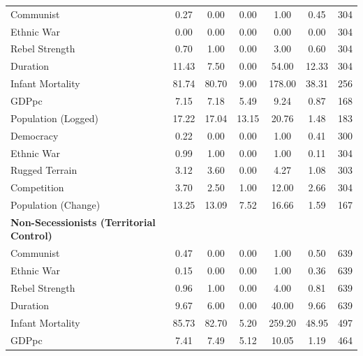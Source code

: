 \documentclass[12pt, letterpaper]{article}
\begin{document}
\begin{table}[htbp]
\begin{tabular}{l*{1}{cccccc}}
Communist           &        0.27&        0.00&        0.00&        1.00&        0.45&         304\\
Ethnic War          &        0.00&        0.00&        0.00&        0.00&        0.00&         304\\
Rebel Strength      &        0.70&        1.00&        0.00&        3.00&        0.60&         304\\
Duration            &       11.43&        7.50&        0.00&       54.00&       12.33&         304\\
Infant Mortality    &       81.74&       80.70&        9.00&      178.00&       38.31&         256\\
GDPpc               &        7.15&        7.18&        5.49&        9.24&        0.87&         168\\
Population (Logged) &       17.22&       17.04&       13.15&       20.76&        1.48&         183\\
Democracy           &        0.22&        0.00&        0.00&        1.00&        0.41&         300\\
Ethnic War          &        0.99&        1.00&        0.00&        1.00&        0.11&         304\\
Rugged Terrain      &        3.12&        3.60&        0.00&        4.27&        1.08&         303\\
Competition         &        3.70&        2.50&        1.00&       12.00&        2.66&         304\\
Population (Change) &       13.25&       13.09&        7.52&       16.66&        1.59&         167\\
\hline
\textbf{Non-Secessionists (Territorial Control)} \\
Communist           &        0.47&        0.00&        0.00&        1.00&        0.50&         639\\
Ethnic War          &        0.15&        0.00&        0.00&        1.00&        0.36&         639\\
Rebel Strength      &        0.96&        1.00&        0.00&        4.00&        0.81&         639\\
Duration            &        9.67&        6.00&        0.00&       40.00&        9.66&         639\\
Infant Mortality    &       85.73&       82.70&        5.20&      259.20&       48.95&         497\\
GDPpc               &        7.41&        7.49&        5.12&       10.05&        1.19&         464\\

\end{tabular}
\end{table}
\end{document}

